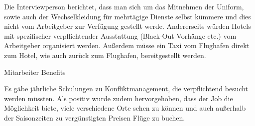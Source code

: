 \documentclass[12pt, a4paper]{article}
\begin{document}
Die Interviewperson berichtet, dass man sich um das Mitnehmen der Uniform, sowie auch der Wechselkleidung für mehrtägige
Dienste selbst kümmere und dies nicht vom Arbeitgeber zur Verfügung gestellt werde.
Andererseits würden Hotels mit spezifischer verpflichtender Ausstattung (Black-Out Vorhänge etc.) vom Arbeitgeber organisiert werden.
Außerdem müsse ein Taxi vom Flughafen direkt zum Hotel, wie auch zurück zum Flughafen, bereitgestellt werden.

Mitarbeiter Benefits

Es gäbe jährliche Schulungen zu Konfliktmanagement, die verpflichtend besucht werden müssten.
Als positiv wurde zudem hervorgehoben, dass der Job die Möglichkeit biete, viele verschiedene Orte sehen zu können und
auch außerhalb der Saisonzeiten zu vergünstigten Preisen Flüge zu buchen.

\newpage
\printbibliography
\end{document}
